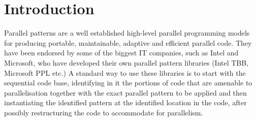 %

\section{Introduction}

Parallel patterns are a well established high-level parallel programming models for producing portable, maintainable, adaptive and efficient parallel code. They have been endorsed by some of the biggest IT companies, such as Intel and Microsoft, who have developed their own parallel pattern libraries (Intel TBB, Microsoft PPL etc.) A standard way to use these libraries is to start with the sequential code base, identifying in it the portions of code that are amenable to parallelisation together with the exact parallel pattern to be applied and then instantiating the identified pattern at the identified location in the code, after possibly restructuring the code to accommodate for parallelism. 


